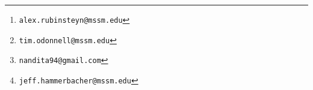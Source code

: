 \usepackage{nips2013,times}


\usepackage[utf8]{inputenc} %
\usepackage[T1]{fontenc}    %
\usepackage{booktabs}       %
\usepackage{amsfonts}       %
\usepackage{nicefrac}       %
\usepackage{microtype}      %


\usepackage[space]{grffile}
\usepackage{natbib}
\usepackage{hyperref}       %
\usepackage{url}            %




\nipsfinalcopy

\author{
Alex Rubinsteyn\thanks{\texttt{alex.rubinsteyn@mssm.edu}} \\
Icahn School of Medicine at Mount Sinai \\
\And
Timothy O'Donnell\thanks{\texttt{tim.odonnell@mssm.edu}} \\
Icahn School of Medicine at Mount Sinai \\
\And
Nandita Damaraju\thanks{\texttt{nandita94@gmail.com}} \\
Georgia Institute of Technology \\
\And
Jeff Hammerbacher\thanks{\texttt{jeff.hammerbacher@mssm.edu}} \\
Icahn School of Medicine at Mount Sinai \\
}

 